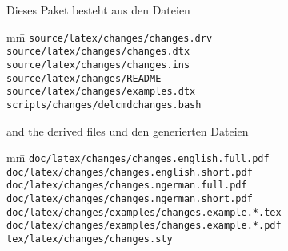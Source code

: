		Dieses Paket besteht aus den Dateien
	\fi

\begin{tabbing}
	mm\=\kill
	\>\texttt{source/latex/changes/changes.drv}\\
	\>\texttt{source/latex/changes/changes.dtx}\\
	\>\texttt{source/latex/changes/changes.ins}\\
	\>\texttt{source/latex/changes/README}\\
	\>\texttt{source/latex/changes/examples.dtx}\\

	\>\texttt{scripts/changes/delcmdchanges.bash}
\end{tabbing}

\ifENGLISH
	and the derived files
\fi
	\ifGERMAN
		und den generierten Dateien
	\fi

\begin{tabbing}
	mm\=\kill
	\>\texttt{doc/latex/changes/changes.english.full.pdf}\\
	\>\texttt{doc/latex/changes/changes.english.short.pdf}\\
	\>\texttt{doc/latex/changes/changes.ngerman.full.pdf}\\
	\>\texttt{doc/latex/changes/changes.ngerman.short.pdf}\\

	\>\texttt{doc/latex/changes/examples/changes.example.*.tex}\\
	\>\texttt{doc/latex/changes/examples/changes.example.*.pdf}\\

	\>\texttt{tex/latex/changes/changes.sty}
\end{tabbing}


